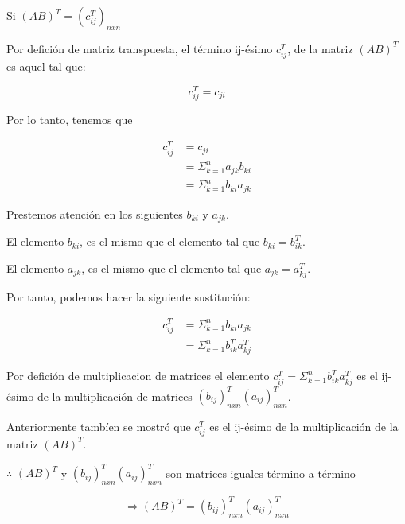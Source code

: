 \vspace*{0.3cm}

Si $(AB)^{T} = \left( c_{ij}^{T} \right)_{nxn} $

\vspace*{0.3cm}

Por defición de matriz transpuesta, el término ij-ésimo $ c_{ij}^{T} $, 
de la matriz $(AB)^{T}$ es aquel tal que:

\begin{equation*}
    c_{ij}^{T} = c_{ji} 
\end{equation*}

Por lo tanto, tenemos que

\begin{align*}
    c_{ij}^{T}  &= c_{ji} \\
                &= \Sigma_{k=1}^{n} a_{jk} b_{ki} \\
                &= \Sigma_{k=1}^{n} b_{ki} a_{jk} 
\end{align*}

Prestemos atención en los siguientes $b_{ki}$ y $a_{jk}$.


El elemento $b_{ki}$, es el mismo que el elemento
tal que $b_{ki}=b_{ik}^{T}$. 


El elemento $a_{jk}$, es el mismo que el elemento
tal que $a_{jk}=a_{kj}^{T}$. 


Por tanto, podemos hacer la siguiente sustitución:

\begin{align*}
    c_{ij}^{T} &= \Sigma_{k=1}^{n} b_{ki} a_{jk} \\
               &= \Sigma_{k=1}^{n} b_{ik}^{T} a_{kj}^{T} 
\end{align*}

Por defición de multiplicacion de matrices el elemento 
$ c_{ij}^{T} = \Sigma_{k=1}^{n} b_{ik}^{T} a_{kj}^{T} $ es el ij-ésimo de la multiplicación de 
matrices $ \left(b_{ij}\right)_{nxn}^{T} \left(a_{ij}\right)_{nxn}^{T} $.

\vspace*{0.35cm}

Anteriormente tambíen se mostró que $ c_{ij}^{T}  $ es el ij-ésimo de la multiplicación de 
la matriz $(AB)^{T}$.

\vspace*{0.35cm}

$ \therefore $ $(AB)^{T}$ y  $ \left(b_{ij}\right)_{nxn}^{T} \left(a_{ij}\right)_{nxn}^{T} $
son matrices iguales término a término

\begin{equation*}
    \Rightarrow  (AB)^{T} = \left(b_{ij}\right)_{nxn}^{T} \left(a_{ij}\right)_{nxn}^{T}
\end{equation*}

